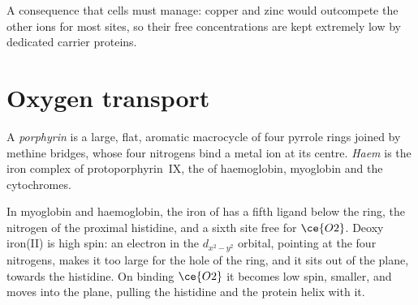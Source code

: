 A consequence that cells must manage: copper and zinc would outcompete the
other ions for most sites, so their free concentrations are kept extremely low
by dedicated carrier proteins.

\section{Oxygen transport}

\begin{definition}\label{def:b3:bioinorganic:haem}
A \emph{porphyrin} is a large, flat, aromatic macrocycle of four
pyrrole rings joined by methine bridges, whose four nitrogens bind a metal ion
at its centre. \emph{Haem} is the iron complex of protoporphyrin~IX,
the  of haemoglobin, myoglobin and the cytochromes.
\end{definition}

In myoglobin and haemoglobin, the iron of  has a fifth ligand below the
ring, the nitrogen of the proximal histidine, and a sixth site free for $\ce{O2}$.
Deoxy iron(II) is high spin: an electron in the $d_{x^2-y^2}$ orbital, pointing at the four
nitrogens, makes it too large for the hole of the ring, and it sits out of the
plane, towards the histidine. On binding $\ce{O2}$ it becomes low spin, smaller, and
moves into the plane, pulling the histidine and the protein helix with it.

